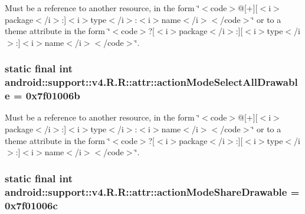 Must be a reference to another resource, in the form \char`\"{}$<$code$>$@\mbox{[}+\mbox{]}\mbox{[}$<$i$>$package$<$/i$>$:\mbox{]}$<$i$>$type$<$/i$>$:$<$i$>$name$<$/i$>$$<$/code$>$\char`\"{} or to a theme attribute in the form \char`\"{}$<$code$>$?\mbox{[}$<$i$>$package$<$/i$>$:\mbox{]}\mbox{[}$<$i$>$type$<$/i$>$:\mbox{]}$<$i$>$name$<$/i$>$$<$/code$>$\char`\"{}. \hypertarget{classandroid_1_1support_1_1v4_1_1_r_1_1attr_b712be6c38e278a2a25340b2729fdcf1}{
\subsubsection[{actionModeSelectAllDrawable}]{\setlength{\rightskip}{0pt plus 5cm}static final int android::support::v4.R.R::attr::actionModeSelectAllDrawable = 0x7f01006b}}
\label{classandroid_1_1support_1_1v4_1_1_r_1_1attr_b712be6c38e278a2a25340b2729fdcf1}


Must be a reference to another resource, in the form \char`\"{}$<$code$>$@\mbox{[}+\mbox{]}\mbox{[}$<$i$>$package$<$/i$>$:\mbox{]}$<$i$>$type$<$/i$>$:$<$i$>$name$<$/i$>$$<$/code$>$\char`\"{} or to a theme attribute in the form \char`\"{}$<$code$>$?\mbox{[}$<$i$>$package$<$/i$>$:\mbox{]}\mbox{[}$<$i$>$type$<$/i$>$:\mbox{]}$<$i$>$name$<$/i$>$$<$/code$>$\char`\"{}. \hypertarget{classandroid_1_1support_1_1v4_1_1_r_1_1attr_74bfeff4f4b93bb08f62dc597c1bab17}{
\subsubsection[{actionModeShareDrawable}]{\setlength{\rightskip}{0pt plus 5cm}static final int android::support::v4.R.R::attr::actionModeShareDrawable = 0x7f01006c}}
\label{classandroid_1_1support_1_1v4_1_1_r_1_1attr_74bfeff4f4b93bb08f62dc597c1bab17}


